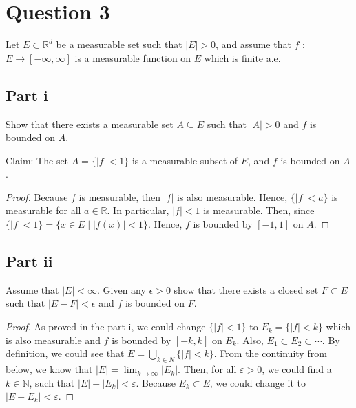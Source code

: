 \section{Question 3}

\begin{question}
   Let $E \subset \mathbb{R}^d$ be a measurable set such that $|E|>0$, and assume that $f$ : $E \rightarrow[-\infty, \infty]$ is a measurable function on $E$ which is finite a.e.
\end{question}

\subsection{Part i}

\begin{question}
    Show that there exists a measurable set $A \subseteq E$ such that $|A|>0$ and $f$ is bounded on $A$.
\end{question}

\begin{answer}
    Claim: The set $A = \{\lvert f \rvert < 1\}$ is a measurable subset of $E$, and $f$ is bounded on $A$.
    
    \begin{proof}
        Because $f$ is measurable, then $\lvert f \rvert$ is also measurable. Hence, $\{\lvert f \rvert < a\}$ is measurable for all $a \in \mathbb{R}$. In particular, ${\lvert f \rvert < 1}$ is measurable. Then, since $\{\lvert f \rvert < 1\} = \{x \in E \mid \lvert f(x) \rvert < 1\}$. Hence, $f$ is bounded by $[-1,1]$ on $A$.
    \end{proof}
\end{answer}

\subsection{Part ii}

\begin{question}
    Assume that $|E|<\infty$. Given any $\epsilon>0$ show that there exists a closed set $F \subset E$ such that $|E-F|<\epsilon$ and $f$ is bounded on $F$.
\end{question}

\begin{answer}
    \begin{proof}
        As proved in the part i, we could change $\{\lvert f \rvert < 1\}$ to $E_k = \{\lvert f \rvert < k\}$ which is also measurable and $f$ is bounded by $[-k,k]$ on $E_k$. Also, $E_1 \subset E_2 \subset \cdots$. By definition, we could see that $E = \bigcup_{k \in N}\{\lvert f \rvert < k\}$. From the continuity from below, we know that $\lvert E \rvert = \lim_{k \to \infty}\lvert E_k \rvert$. Then, for all $\varepsilon > 0$, we could find a $k \in \mathbb{N}$, such that $\lvert E \rvert - \lvert E_k \rvert < \varepsilon$. Because $E_k \subset E$, we could change it to $\lvert E - E_k \rvert < \varepsilon$.
    \end{proof}
\end{answer}

